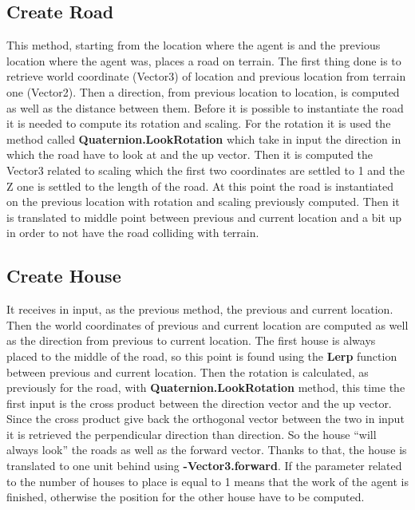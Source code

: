 \documentclass[12pt]{article}
\begin{document}
    \subsection{Create Road} \label{section:CreateRoad}
    This method, starting from the location where the agent is and the previous location where the agent was, places a road on terrain. The first thing done is to retrieve 
    world coordinate (Vector3) of location and previous location from terrain one (Vector2). Then a direction, from previous location to location, is computed as well as the distance
    between them. Before it is possible to instantiate the road it is needed to compute its rotation and scaling. For the rotation it is used the 
    method called \textbf{Quaternion.LookRotation} which take in input the direction in which the road have to look at and the up vector. Then it is computed the Vector3
    related to scaling which the first two coordinates are settled to 1 and the Z one is settled to the length of the road. At this point the road is instantiated on the previous
    location with rotation and scaling previously computed. Then it is translated to middle point between previous and current location and a bit up in order to not have the 
    road colliding with terrain.

    \subsection{Create House} \label{section:CreateHouse}
    It receives in input, as the previous method, the previous and current location. Then the world coordinates of previous and current location are 
    computed as well as the direction from previous to current location. The first house is always placed to the middle of the road, so this point is found using the \textbf{Lerp}
    function between previous and current location. Then the rotation is calculated, as previously for the road, with \textbf{Quaternion.LookRotation} method, this time the
    first input is the cross product between the direction vector and the up vector. Since the cross product give back the orthogonal vector between the two in input
    it is retrieved the perpendicular direction than direction. So the house ``will always look'' the roads as well as the forward vector. Thanks to that, the house is
    translated to one unit behind using \textbf{-Vector3.forward}. If the parameter related to the number of houses to place is equal to 1 means that the work of the agent is finished, 
    otherwise the position for the other house have to be computed. 
    
\end{document}
